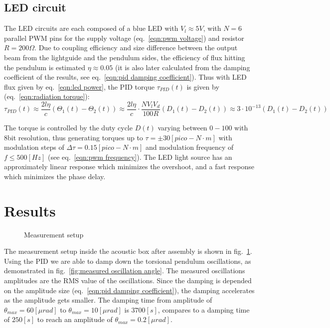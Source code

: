 \documentclass[\main/master.tex]{subfiles}
\begin{document}
\subsection{LED circuit}
The LED circuits are each composed of a blue LED with $V_l\approx 5V$, with $N=6$ parallel PWM pins for the supply voltage (eq.~\ref{eqn:pwm voltage}) and resistor $R = 200\Omega$. Due to coupling efficiency and size difference between the output beam from the lightguide and the pendulum sides, the efficiency of flux hitting the pendulum is estimated $\eta \approx 0.05$ (it is also later calculated from the damping coefficient of the results, see eq.~\ref{eqn:pid damping coefficient}). Thus with LED flux given by eq.~\ref{eqn:led power}, the PID torque $\tau_{PID}(t)$ is given by (eq.~\ref{eqn:radiation torque}):
\begin{equation}
\tau_{PID}(t) \approx \frac{2l\eta}{{c}} (\Theta_1(t) -\Theta_2(t)) \approx \frac{2l\eta}{{c}} \cdot\frac{N V_l V_d}{100R}(D_1(t) -D_2(t))  \approx   3\cdot 10^{-13}(D_1(t) -D_2(t)) 
\label{eqn:led torque}
\end{equation}
\par\noindent
The torque is controlled by the duty cycle $D(t)$ varying between $0-100$ with 8bit resolution, thus generating torques up to $\tau = \pm 30 [pico-N\cdot m]$ with modulation steps of $\Delta\tau = 0.15 [pico-N\cdot m]$ and modulation frequency of $f \leq 500[Hz]$ (see eq.~\ref{eqn:pwm frequency}). The LED light source has an approximately linear response which minimizes the overshoot, and a fast response which minimizes the phase delay.
\newpage
\section{Results} 
\begin{figure}[htbp]
	\centering
	\caption[Measurement setup]{Measurement setup}
	\label{fig:actual system}
\end{figure}
\FloatBarrier
The measurement setup inside the acoustic box after assembly is shown in fig.~\ref{fig:actual system}. Using the PID we are able to damp down the torsional pendulum oscillations, as demonstrated in fig.~\ref{fig:measured oscillation angle}. The measured oscillations amplitudes are the RMS value of the oscillations. Since the damping is depended on the amplitude size (eq.~\ref{eqn:pid damping coefficient}), the damping accelerates as the amplitude gets smaller. The damping time from amplitude of $\theta_{max} = 60 [\mu rad] $ to $\theta_{max} = 10[\mu rad] $ is $3700[s]$, compares to a damping time of $250[s]$ to reach an amplitude of $\theta_{max} = 0.2[\mu rad]$.
\end{document}
